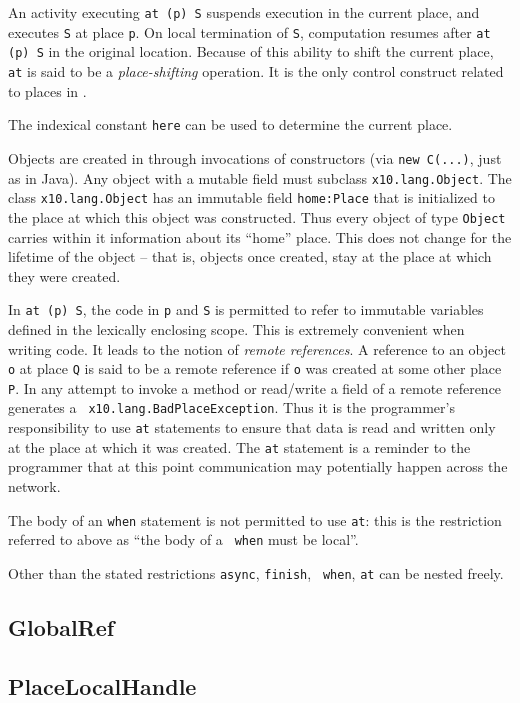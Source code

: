 An activity executing {\tt at (p) S} suspends execution in the current
place, and executes {\tt S} at place {\tt p}. On local termination of
{\tt S}, computation resumes after {\tt at (p) S} in the original
location. Because of this ability to shift the current place, {\tt at}
is said to be a {\em place-shifting} operation. It is the only
control construct related to places in \Xten.

The indexical constant {\tt here} can be used to determine the current
place.

Objects are created in \Xten{} through invocations of constructors
(via {\tt new C(...)}, just as in Java). Any object with a mutable
field must subclass {\tt x10.lang.Object}. The class {\tt x10.lang.Object}
has an immutable field {\tt home:Place} that is initialized to the
place at which this object was constructed. Thus every object of type
{\tt Object} carries within it information about its ``home'' place. This
does not change for the lifetime of the object -- that is, objects
once created, stay at the place at which they were created.

In {\tt at (p) S}, the code in {\tt p} and {\tt S} is permitted to
refer to immutable variables defined in the lexically enclosing
scope. This is extremely convenient when writing code. It leads to the
notion of {\em remote references}. A reference to an object {\tt o} at
place {\tt Q} is said to be a remote reference if {\tt o} was created
at some other place {\tt P}. In \Xten{} any attempt to invoke a method
or read/write a field of a remote reference generates a {\tt
x10.lang.BadPlaceException}. Thus it is the programmer's
responsibility to use {\tt at} statements to ensure that data is read
and written only at the place at which it was created. The {\tt at}
statement is a reminder to the programmer that at this point
communication may potentially happen across the network.


The body of an {\tt when} statement is not permitted to use {\tt at}:
this is the restriction referred to above as ``the body of a {\tt
when} must be local''.  

Other than the stated restrictions {\tt async}, {\tt finish}, {\tt
when}, {\tt at} can be nested freely.

\subsection{GlobalRef}
\subsection{PlaceLocalHandle}


